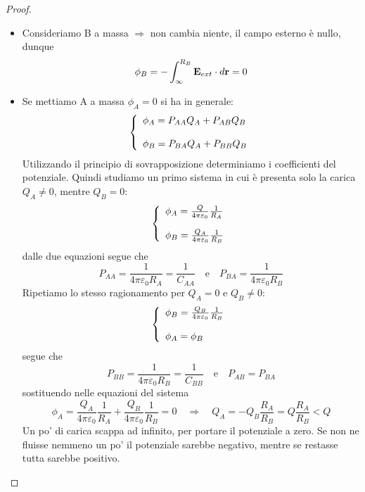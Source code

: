\begin{proof}
\
\begin{itemize}
	\item 
	Consideriamo B a massa $\Rightarrow$ non cambia niente, il campo esterno \`e nullo, dunque 
	\begin{equation*}
		\phi_{B} = - \int_{\infty}^{R_{B}} \bold{E}_{ext} \cdot d\bold{r} = 0
	\end{equation*}
\item Se mettiamo A a massa $\phi_{A} = 0$ si ha in generale:
	\begin{equation*}
		\left \{ \begin{array}{l}
			\phi_{A} = P_{AA}Q_{A} + P_{AB} Q_{B} \\ \rule{0pt}{20pt}
			\phi_{B} = P_{BA}Q_{A} + P_{BB}Q_{B}
		\end{array}\right.
	\end{equation*}
Utilizzando il principio di sovrapposizione determiniamo i coefficienti del potenziale. Quindi studiamo un primo sistema in cui \`e presenta solo la carica   $Q_A \neq 0$, mentre $Q_{B} = 0$:
\begin{equation*}
	\left \{ \begin{array}{l}
		\phi_{A} = \frac{Q}{4 \pi \varepsilon_0} \frac{1}{R_{A}}\\ \rule{0pt}{20pt}
		\phi_{B} = \frac{Q_{A}}{4 \pi \varepsilon_0} \frac{1}{R_{B}}
	\end{array}\right.
\end{equation*}
dalle due equazioni segue che 
\begin{equation*}
	P_{AA} = \frac{1}{4 \pi \varepsilon_0 R_{A}} = \frac{1}{C_{AA}}  \quad \text{e} \quad P_{BA} = \frac{1}{4 \pi \varepsilon_0 R_{B}} 
\end{equation*}
Ripetiamo lo stesso ragionamento per $Q_{A} = 0$ e $Q_{B} \neq 0$:
\begin{equation*}
	\left \{ \begin{array}{l}
		\phi_{B} = \frac{Q_{B}}{4 \pi \varepsilon_0} \frac{1}{R_{B}} \\ \rule{0pt}{20pt}
		\phi_{A} = \phi_{B}
	\end{array}\right.
\end{equation*}
segue che 
\begin{equation*}
	P_{BB} = \frac{1}{4 \pi \varepsilon_0 R_{B}} = \frac{1}{C_{BB}} \quad \text{e} \quad P_{AB} = P_{BA}
\end{equation*}
sostituendo nelle equazioni del sistema
\begin{equation*}
	\phi_{A} = \frac{Q_{A}}{4 \pi \varepsilon_0} \frac{1}{R_{A}} + \frac{Q_{B}}{4 \pi \varepsilon_0}\frac{1}{R_{B}} = 0 \quad \Longrightarrow  \quad Q_{A} = - Q_{B}\frac{R_{A}}{R_{B}} = Q \frac{R_{A}}{R_{B}} < Q
\end{equation*}
Un po' di carica scappa ad infinito, per portare il potenziale a zero. Se non ne fluisse nemmeno un po' il potenziale sarebbe negativo, mentre se restasse tutta sarebbe positivo.
\end{itemize}
\end{proof}

